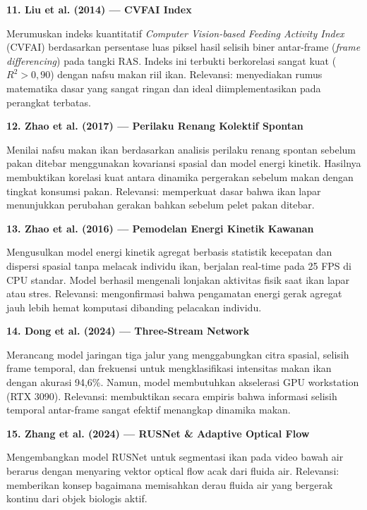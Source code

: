 \documentclass[11pt,a4paper]{article}
\begin{document}
\noindent\textbf{11. Liu et al. (2014) --- CVFAI Index}\par
\noindent Merumuskan indeks kuantitatif \textit{Computer Vision-based Feeding Activity Index} (CVFAI) berdasarkan persentase luas piksel hasil selisih biner antar-frame (\textit{frame differencing}) pada tangki RAS. Indeks ini terbukti berkorelasi sangat kuat ($R^2 > 0,90$) dengan nafsu makan riil ikan. Relevansi: menyediakan rumus matematika dasar yang sangat ringan dan ideal diimplementasikan pada perangkat terbatas.
\vspace{0.7em}

\noindent\textbf{12. Zhao et al. (2017) --- Perilaku Renang Kolektif Spontan}\par
\noindent Menilai nafsu makan ikan berdasarkan analisis perilaku renang spontan sebelum pakan ditebar menggunakan kovariansi spasial dan model energi kinetik. Hasilnya membuktikan korelasi kuat antara dinamika pergerakan sebelum makan dengan tingkat konsumsi pakan. Relevansi: memperkuat dasar bahwa ikan lapar menunjukkan perubahan gerakan bahkan sebelum pelet pakan ditebar.
\vspace{0.7em}

\noindent\textbf{13. Zhao et al. (2016) --- Pemodelan Energi Kinetik Kawanan}\par
\noindent Mengusulkan model energi kinetik agregat berbasis statistik kecepatan dan dispersi spasial tanpa melacak individu ikan, berjalan real-time pada 25 FPS di CPU standar. Model berhasil mengenali lonjakan aktivitas fisik saat ikan lapar atau stres. Relevansi: mengonfirmasi bahwa pengamatan energi gerak agregat jauh lebih hemat komputasi dibanding pelacakan individu.
\vspace{0.7em}

\noindent\textbf{14. Dong et al. (2024) --- Three-Stream Network}\par
\noindent Merancang model jaringan tiga jalur yang menggabungkan citra spasial, selisih frame temporal, dan frekuensi untuk mengklasifikasi intensitas makan ikan dengan akurasi 94,6\%. Namun, model membutuhkan akselerasi GPU workstation (RTX 3090). Relevansi: membuktikan secara empiris bahwa informasi selisih temporal antar-frame sangat efektif menangkap dinamika makan.
\vspace{0.7em}

\noindent\textbf{15. Zhang et al. (2024) --- RUSNet \& Adaptive Optical Flow}\par
\noindent Mengembangkan model RUSNet untuk segmentasi ikan pada video bawah air berarus dengan menyaring vektor optical flow acak dari fluida air. Relevansi: memberikan konsep bagaimana memisahkan derau fluida air yang bergerak kontinu dari objek biologis aktif.
\vspace{0.7em}
\end{document}
